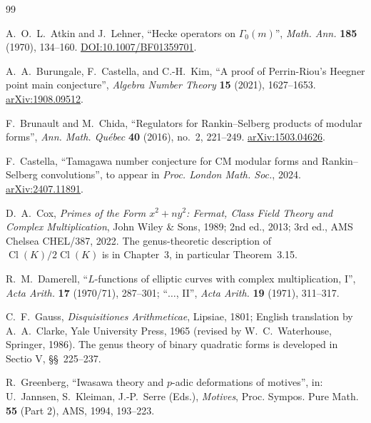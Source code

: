 \documentclass[11pt]{amsart}
\theoremstyle{definition}
\theoremstyle{remark}
\DeclareMathOperator{\Cl}{Cl}
\begin{document}

\begin{thebibliography}{99}

A.~O.~L.~Atkin and J.~Lehner, ``Hecke operators on \(\Gamma_{0}(m)\)'',
\emph{Math. Ann.} \textbf{185} (1970), 134--160.
\href{https://doi.org/10.1007/BF01359701}{DOI:10.1007/BF01359701}.

A.~A.~Burungale, F.~Castella, and C.-H.~Kim, ``A proof of Perrin-Riou's
Heegner point main conjecture'',
\emph{Algebra Number Theory} \textbf{15} (2021), 1627--1653.
\href{https://arxiv.org/abs/1908.09512}{arXiv:1908.09512}.

F.~Brunault and M.~Chida, ``Regulators for Rankin--Selberg products of
modular forms'',
\emph{Ann. Math. Qu\'ebec} \textbf{40} (2016), no.~2, 221--249.
\href{https://arxiv.org/abs/1503.04626}{arXiv:1503.04626}.

F.~Castella, ``Tamagawa number conjecture for CM modular forms and
Rankin--Selberg convolutions'',
to appear in \emph{Proc. London Math. Soc.}, 2024.
\href{https://arxiv.org/abs/2407.11891}{arXiv:2407.11891}.

D.~A.~Cox, \emph{Primes of the Form \(x^{2} + n y^{2}\): Fermat,
Class Field Theory and Complex Multiplication}, John Wiley \& Sons,
1989; 2nd ed., 2013; 3rd ed., AMS Chelsea CHEL/387, 2022. The
genus-theoretic description of \(\Cl(K)/2\Cl(K)\) is in Chapter~3,
in particular Theorem~3.15.

R.~M.~Damerell, ``\(L\)-functions of elliptic curves with complex
multiplication, I'', \emph{Acta Arith.} \textbf{17} (1970/71),
287--301; ``\(\ldots\), II'', \emph{Acta Arith.} \textbf{19} (1971),
311--317.

C.~F.~Gauss, \emph{Disquisitiones Arithmeticae}, Lipsiae, 1801; English
translation by A.~A.~Clarke, Yale University Press, 1965 (revised by
W.~C.~Waterhouse, Springer, 1986). The genus theory of binary
quadratic forms is developed in Sectio V, \S\S~225--237.

R.~Greenberg, ``Iwasawa theory and \(p\)-adic deformations of
motives'', in: U.~Jannsen, S.~Kleiman, J.-P.~Serre (Eds.),
\emph{Motives}, Proc. Sympos. Pure Math. \textbf{55} (Part 2), AMS,
1994, 193--223.


\end{thebibliography}
\end{document}
